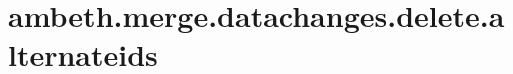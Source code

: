\section{ambeth.merge.datachanges.delete.alternateids}
\label{configuration:AmbethMergeDatachangesDeleteAlternateids}
\TODO
